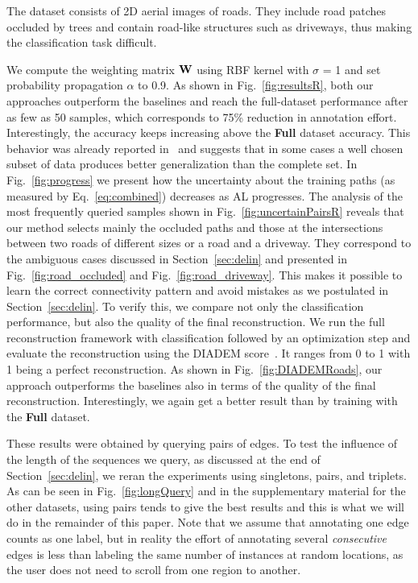 \documentclass[10pt,twocolumn,letterpaper]{article}
\begin{document}
The dataset  consists of 2D  aerial images of  roads. They  include road
patches occluded by trees and contain road-like structures such as driveways, thus making the classification task difficult.

We compute the weighting matrix $\mathbf{W}$ using RBF kernel with $\sigma$ = 1 and set probability propagation $\alpha$ to 0.9. As shown in Fig.~\ref{fig:resultsR}, both our approaches outperform the baselines
and reach the full-dataset performance after as few as 50 samples, which corresponds
to  75\%  reduction in  annotation  effort. Interestingly, the  accuracy  keeps
increasing above the  \textbf{Full} dataset accuracy. This  behavior was already
reported in~\cite{Schohn00} and suggests that in some cases a well chosen subset
of data  produces better generalization than  the complete set. In Fig.~\ref{fig:progress} we present how the uncertainty about the training paths (as measured by Eq.~\ref{eq:combined}) decreases as AL progresses. The  analysis of
the  most frequently  queried  samples  shown in  Fig.~\ref{fig:uncertainPairsR}
reveals  that our  method selects  mainly the  occluded paths  and those at the
intersections between  two roads of different  sizes or a road  and a driveway. They
correspond  to  the ambiguous  cases  discussed  in Section~\ref{sec:delin}  and
presented in Fig.~\ref{fig:road_occluded} and Fig.~\ref{fig:road_driveway}. This makes it possible to learn the correct connectivity pattern and avoid mistakes as we postulated in Section~\ref{sec:delin}. To verify this, we compare not only the classification performance, but also the quality of the final reconstruction. We run the full reconstruction framework with
classification followed by an optimization step and evaluate the reconstruction using the DIADEM score~\cite{Ascoli10}. It ranges from 0 to 1 with 1 being a perfect reconstruction. As shown in Fig.~\ref{fig:DIADEMRoads}, our approach outperforms the baselines also in terms of the quality of the final reconstruction. Interestingly, we again get a better result than by training with the \textbf{Full} dataset.

These results  were obtained  by querying  pairs of  edges. To  test the
  influence of the length of the sequences  we query, as discussed at the end of
  Section~\ref{sec:delin}, we reran the experiments using singletons, pairs, and
  triplets. As can  be seen in Fig.~\ref{fig:longQuery} and in the supplementary material for the other datasets, using pairs tends to give the best results and   this  is   what  we   will  do  in   the  remainder   of  this
  paper. Note that we assume that annotating one edge counts as one label, but in reality the effort of annotating several \textit{consecutive} edges is less than labeling the same number of instances at random locations, as the user does not need to scroll from one region to another.
\end{document}
